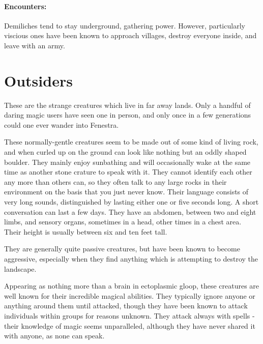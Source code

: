 \paragraph{Encounters:} Demiliches tend to stay underground, gathering power.  However, particularly viscious ones have been known to approach villages, destroy everyone inside, and leave with an army.

\section{Outsiders}

These are the strange creatures which live in far away lands.  Only a handful of daring magic users have seen one in person, and only once in a few generations could one ever wander into Fenestra.

\label{rockman}

\rockman

These normally-gentle creatures seem to be made out of some kind of living rock, and when curled up on the ground can look like nothing but an oddly shaped boulder.  They mainly enjoy sunbathing and will occasionally wake at the same time as another stone crature to speak with it.  They cannot identify each other any more than others can, so they often talk to any large rocks in their environment on the basis that you just never know.  Their language consists of very long sounds, distinguished by lasting either one or five seconds long.  A short conversation can last a few days.  They have an abdomen, between two and eight limbs, and sensory organs, sometimes in a head, other times in a chest area.  Their height is usually between six and ten feet tall.

They are generally quite passive creatures, but have been known to become aggressive, especially when they find anything which is attempting to destroy the landscape.

\label{archmage}

\archmage

Appearing as nothing more than a brain in ectoplasmic gloop, these creatures are well known for their incredible magical abilities.  They typically ignore anyone or anything around them until attacked, though they have been known to attack individuals within groups for reasons unknown.  They attack always with spells - their knowledge of magic seems unparalleled, although they have never shared it with anyone, as none can speak.

